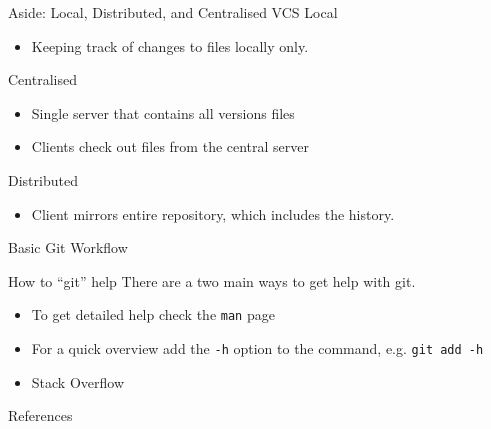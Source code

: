 \documentclass{beamer}
\begin{document}
\begin{frame}{Aside: Local, Distributed, and Centralised VCS}
    Local
    \begin{itemize}
        \item Keeping track of changes to files locally only.
    \end{itemize}
    Centralised
    \begin{itemize}
        \item Single server that contains all versions files
        \item Clients check out files from the central server
    \end{itemize}
    Distributed
    \begin{itemize}
        \item Client mirrors entire repository, which includes the history.
    \end{itemize}
\end{frame}

\begin{frame}{Basic Git Workflow}
    
\end{frame}

\begin{frame}{How to ``git'' help}
There are a two main ways to get help with git.
\begin{itemize}
    \item To get detailed help check the \texttt{man} page
    \item For a quick overview add the \texttt{-h} option to the command, e.g. \texttt{git add -h}
    \item Stack Overflow
    
\end{itemize}
\end{frame}

\begin{frame}{References}
    \printbibliography[heading=none]
\end{frame}
\end{document}
